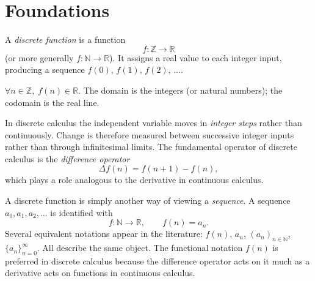 
\section{Foundations}

\begin{tcolorbox}[colback=defbox, colframe=defborder, arc=2pt,
  left=6pt, right=6pt, top=4pt, bottom=4pt,
  title={\small\textbf{Definition (Discrete Function)}},
  fonttitle=\small\bfseries]
A \emph{discrete function} is a function
\[
f:\mathbb{Z} \to \mathbb{R}
\]
(or more generally \(f:\mathbb{N}\to\mathbb{R}\)).
It assigns a real value to each integer input, producing a sequence
\(f(0),\, f(1),\, f(2),\, \dots\).
\end{tcolorbox}
\label{def:discrete-function}

\begin{remark*}
\(\forall n \in \mathbb{Z},\; f(n) \in \mathbb{R}\).
The domain is the integers (or natural numbers); the codomain is the real line.
\end{remark*}

\begin{remark*}
In discrete calculus the independent variable moves in \emph{integer steps}
rather than continuously. Change is therefore measured between
successive integer inputs rather than through infinitesimal limits.
The fundamental operator of discrete calculus is the \emph{difference operator}
\[
\Delta f(n)=f(n+1)-f(n),
\]
which plays a role analogous to the derivative in continuous calculus.
\end{remark*}

\begin{remark*}
A discrete function is simply another way of viewing a \emph{sequence}.
A sequence \(a_0, a_1, a_2, \dots\) is identified with
\[
f : \mathbb{N} \to \mathbb{R}, \qquad f(n) = a_n.
\]
Several equivalent notations appear in the literature:
\(f(n)\), \(a_n\), \((a_n)_{n\in\mathbb{N}}\), \(\{a_n\}_{n=0}^{\infty}\).
All describe the same object. The functional notation \(f(n)\) is preferred
in discrete calculus because the difference operator acts on it much as a
derivative acts on functions in continuous calculus.
\end{remark*}
